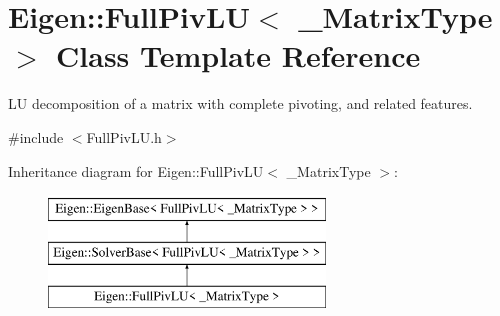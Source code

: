 \hypertarget{class_eigen_1_1_full_piv_l_u}{}\section{Eigen\+::Full\+Piv\+LU$<$ \+\_\+\+Matrix\+Type $>$ Class Template Reference}
\label{class_eigen_1_1_full_piv_l_u}


LU decomposition of a matrix with complete pivoting, and related features.  




{\ttfamily \#include $<$Full\+Piv\+L\+U.\+h$>$}

Inheritance diagram for Eigen\+::Full\+Piv\+LU$<$ \+\_\+\+Matrix\+Type $>$\+:\begin{figure}[H]
\begin{center}
\leavevmode
\includegraphics[height=3.000000cm]{class_eigen_1_1_full_piv_l_u}
\end{center}
\end{figure}
